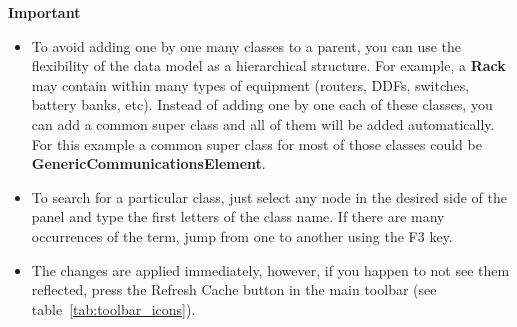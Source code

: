 \documentclass[a4paper]{article}
\begin{document}
	\begin{framed} {\large \textbf{Important}}
		\begin{itemize}
			\item To avoid adding one by one many classes to a parent, you can use the flexibility of the data model as a hierarchical structure. For example, a \textbf{Rack} may contain within many types of equipment (routers, DDFs, switches, battery banks, etc). Instead of adding one by one each of these classes, you can add a common super class and all of them will be added automatically. For this example a common super class for most of those classes could be \textbf{GenericCommunicationsElement}.
			\item To search for a particular class, just select any node in the desired side of the panel and type the first letters of the class name. If there are many occurrences of the term, jump from one to another using the F3 key.
			\item The changes are applied immediately, however, if you happen to not see them reflected, press the Refresh Cache button in the main toolbar (see table~\ref{tab:toolbar_icons}).
		\end{itemize}
	\end{framed}
	\newpage
	
	\newpage
\end{document}
